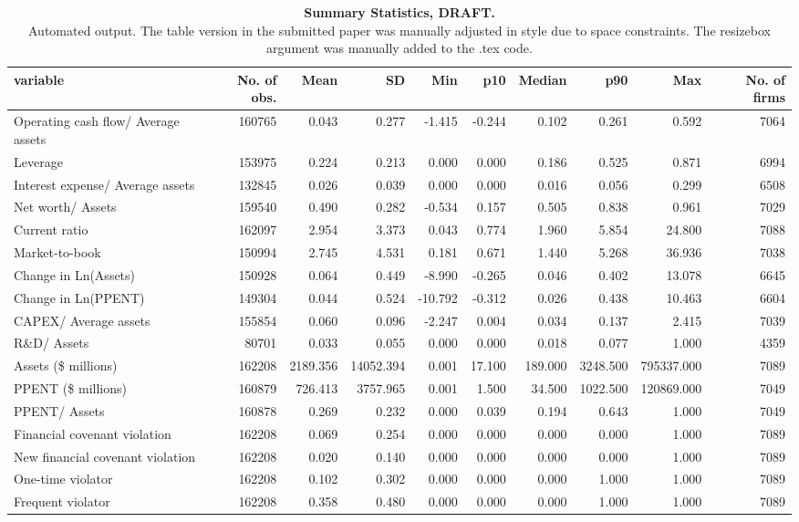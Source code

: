\begin{table}[ht]
\centering
\caption{\textbf{Summary Statistics, DRAFT.} \\
                     Automated output. The table version in the submitted paper 
                     was manually adjusted in style due to space constraints. The resizebox{} argument 
             was manually added to the .tex code.} 
\begin{tabular}{lrrrrrrrrr}
  \hline
variable & No. of obs. & Mean & SD & Min & p10 & Median & p90 & Max & No. of firms \\ 
  \hline
Operating cash flow/ Average assets & 160765 & 0.043 & 0.277 & -1.415 & -0.244 & 0.102 & 0.261 & 0.592 & 7064 \\ 
  Leverage & 153975 & 0.224 & 0.213 & 0.000 & 0.000 & 0.186 & 0.525 & 0.871 & 6994 \\ 
  Interest expense/ Average assets & 132845 & 0.026 & 0.039 & 0.000 & 0.000 & 0.016 & 0.056 & 0.299 & 6508 \\ 
  Net worth/ Assets & 159540 & 0.490 & 0.282 & -0.534 & 0.157 & 0.505 & 0.838 & 0.961 & 7029 \\ 
  Current ratio & 162097 & 2.954 & 3.373 & 0.043 & 0.774 & 1.960 & 5.854 & 24.800 & 7088 \\ 
  Market-to-book & 150994 & 2.745 & 4.531 & 0.181 & 0.671 & 1.440 & 5.268 & 36.936 & 7038 \\ 
  Change in Ln(Assets) & 150928 & 0.064 & 0.449 & -8.990 & -0.265 & 0.046 & 0.402 & 13.078 & 6645 \\ 
  Change in Ln(PPENT) & 149304 & 0.044 & 0.524 & -10.792 & -0.312 & 0.026 & 0.438 & 10.463 & 6604 \\ 
  CAPEX/ Average assets & 155854 & 0.060 & 0.096 & -2.247 & 0.004 & 0.034 & 0.137 & 2.415 & 7039 \\ 
  R\&D/ Assets & 80701 & 0.033 & 0.055 & 0.000 & 0.000 & 0.018 & 0.077 & 1.000 & 4359 \\ 
  Assets (\$ millions) & 162208 & 2189.356 & 14052.394 & 0.001 & 17.100 & 189.000 & 3248.500 & 795337.000 & 7089 \\ 
  PPENT (\$ millions) & 160879 & 726.413 & 3757.965 & 0.001 & 1.500 & 34.500 & 1022.500 & 120869.000 & 7049 \\ 
  PPENT/ Assets & 160878 & 0.269 & 0.232 & 0.000 & 0.039 & 0.194 & 0.643 & 1.000 & 7049 \\ 
  Financial covenant violation & 162208 & 0.069 & 0.254 & 0.000 & 0.000 & 0.000 & 0.000 & 1.000 & 7089 \\ 
  New financial covenant violation & 162208 & 0.020 & 0.140 & 0.000 & 0.000 & 0.000 & 0.000 & 1.000 & 7089 \\ 
  One-time violator & 162208 & 0.102 & 0.302 & 0.000 & 0.000 & 0.000 & 1.000 & 1.000 & 7089 \\ 
  Frequent violator & 162208 & 0.358 & 0.480 & 0.000 & 0.000 & 0.000 & 1.000 & 1.000 & 7089 \\ 
   \hline
\end{tabular}
\end{table}
